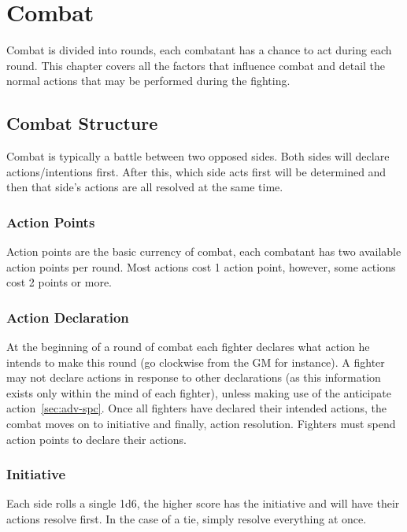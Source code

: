 \documentclass[a4paper,10pt,oneside]{book}
\newcommand{\textlf}[1]{\textbf{\titlecap{#1}}}
\newcommand{\textlfirst}[1]{\textbf{\textit{\titlecap{#1}}}}
\begin{document}
\chapter{Combat}
\label{chap:combat}
Combat is divided into rounds, each combatant has a chance to act during each round. This chapter covers all the factors that influence combat and detail the normal actions that may be performed during the fighting.

\section{Combat Structure}
Combat is typically a battle between two opposed sides. Both sides will declare actions/intentions first. After this, which side acts first will be determined and then that side's actions are all resolved at the same time.  

\subsection{Action Points}
Action points are the basic currency of combat, each combatant has two available action points per round. Most actions cost 1 action point, however, some actions cost 2 points or more. 

\subsection{Action Declaration}
At the beginning of a round of combat each fighter declares what action he intends to make this round (go clockwise from the GM for instance). A fighter may not declare actions in response to other declarations (as this information exists only within the mind of each fighter), unless making use of the anticipate action~\ref{sec:adv-spc}. Once all fighters have declared their intended actions, the combat moves on to initiative and finally, action resolution. Fighters must spend action points to declare their actions.


\subsection{Initiative}
Each side rolls a single 1d6, the higher score has the initiative and will have their actions resolve first. In the case of a tie, simply resolve everything at once.
\end{document}
